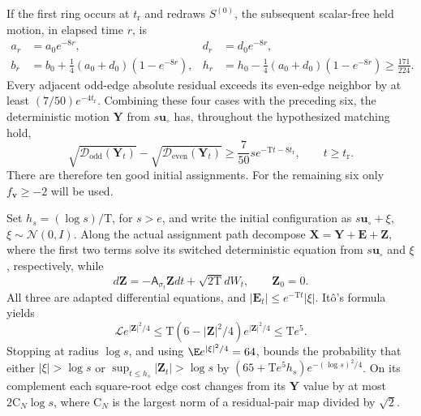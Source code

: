 If the first ring occurs at \(t_{\mathrm r}\) and redraws \(S^{(0)}\),
the subsequent scalar-free held motion, in elapsed time \(r\), is
\[
 \begin{aligned}
 a_r&=a_0e^{-8r},&d_r&=d_0e^{-8r},\\
 b_r&=b_0+\tfrac14(a_0+d_0)(1-e^{-8r}),&
 h_r&=h_0-\tfrac14(a_0+d_0)(1-e^{-8r})\ge\tfrac{171}{224}.
 \end{aligned}
\]
Every adjacent odd-edge absolute residual exceeds its even-edge neighbor
by at least \((7/50)e^{-4t_{\mathrm r}}\). Combining these four cases
with the preceding six, the deterministic motion \(\mathbf Y\) from
\(s\mathbf u_\circ\) has, throughout the hypothesized matching hold,
\begin{equation}
 \sqrt{\mathcal D_{\mathrm{odd}}(\mathbf Y_t)}
 -\sqrt{\mathcal D_{\mathrm{even}}(\mathbf Y_t)}
 \ge\frac7{50}s e^{-\mathrm Tt-8t_{\mathrm r}},
 \qquad t\ge t_{\mathrm r}.
\label{eq:phil-selection-lock-margin}
\end{equation}
There are therefore ten good initial assignments. For the remaining six
only \(f_{\mathbf v}\ge-2\) will be used.

Set \(h_s=(\log s)/\mathrm T\), for \(s>e\), and write the initial
configuration as \(s\mathbf u_\circ+\xi\), \(\xi\sim\mathcal N(0,I)\).
Along the actual assignment path decompose
\(\mathbf X=\mathbf Y+\mathbf E+\mathbf Z\), where the first two terms
solve its switched deterministic equation from \(s\mathbf u_\circ\) and
\(\xi\), respectively, while
\[
 d\mathbf Z=-\mathsf A_{\sigma_t}\mathbf Zdt+\sqrt{2\mathrm T}dW_t,
 \qquad\mathbf Z_0=0.
\]
All three are adapted differential equations, and
\(|\mathbf E_t|\le e^{-\mathrm Tt}|\xi|\).
It\^o's formula yields
\[
 \mathscr L e^{|\mathbf Z|^2/4}
 \le\mathrm T(6-|\mathbf Z|^2/4)e^{|\mathbf Z|^2/4}
 \le\mathrm Te^5.
\]
Stopping at radius \(\log s\), and using
\(\E e^{|\xi|^2/4}=64\), bounds the probability that either
\(|\xi|>\log s\) or \(\sup_{t\le h_s}|\mathbf Z_t|>\log s\) by
\((65+\mathrm Te^5h_s)e^{-(\log s)^2/4}\).
On its complement each square-root edge cost changes from its
\(\mathbf Y\) value by at most \(2\mathrm C_N\log s\), where
\(\mathrm C_N\) is the largest norm of a residual-pair map divided by
\(\sqrt2\).

